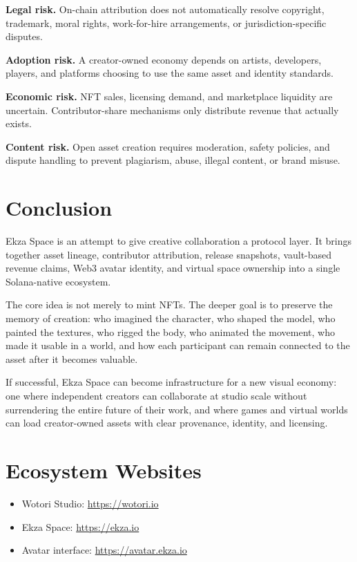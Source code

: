 \documentclass[10pt,twocolumn]{article}
\begin{document}
\textbf{Legal risk.} On-chain attribution does not automatically resolve copyright, trademark, moral rights, work-for-hire arrangements, or jurisdiction-specific disputes.

\textbf{Adoption risk.} A creator-owned economy depends on artists, developers, players, and platforms choosing to use the same asset and identity standards.

\textbf{Economic risk.} NFT sales, licensing demand, and marketplace liquidity are uncertain. Contributor-share mechanisms only distribute revenue that actually exists.

\textbf{Content risk.} Open asset creation requires moderation, safety policies, and dispute handling to prevent plagiarism, abuse, illegal content, or brand misuse.

\section{Conclusion}
Ekza Space is an attempt to give creative collaboration a protocol layer. It brings together asset lineage, contributor attribution, release snapshots, vault-based revenue claims, Web3 avatar identity, and virtual space ownership into a single Solana-native ecosystem.

The core idea is not merely to mint NFTs. The deeper goal is to preserve the memory of creation: who imagined the character, who shaped the model, who painted the textures, who rigged the body, who animated the movement, who made it usable in a world, and how each participant can remain connected to the asset after it becomes valuable.

If successful, Ekza Space can become infrastructure for a new visual economy: one where independent creators can collaborate at studio scale without surrendering the entire future of their work, and where games and virtual worlds can load creator-owned assets with clear provenance, identity, and licensing.

\section{Ecosystem Websites}
\begin{itemize}
    \item Wotori Studio: \url{https://wotori.io}
    \item Ekza Space: \url{https://ekza.io}
    \item Avatar interface: \url{https://avatar.ekza.io}
\end{itemize}
\end{document}
